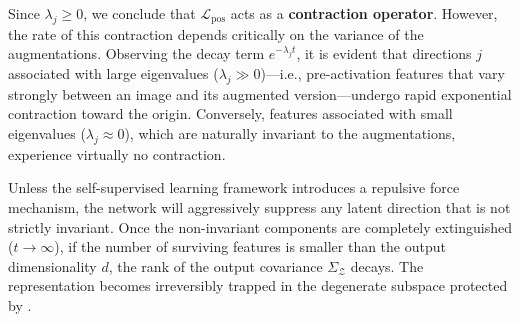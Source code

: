\documentclass[11pt, oneside, openany]{book}
\begin{document}
Since $\lambda_{j} \geq 0$, we conclude that $\mathcal{L}_{\text{pos}}$ acts as a \textbf{contraction operator}. However, the rate of this contraction depends critically on the variance of the augmentations. Observing the decay term $e^{-\lambda_{j} t}$, it is evident that directions $j$ associated with large eigenvalues ($\lambda_{j} \gg 0$)---i.e., pre-activation features that vary strongly between an image and its augmented version---undergo rapid exponential contraction toward the origin. Conversely, features associated with small eigenvalues ($\lambda_{j} \approx 0$), which are naturally invariant to the augmentations, experience virtually no contraction.

Unless the self-supervised learning framework introduces a repulsive force mechanism, the network will aggressively suppress any latent direction that is not strictly invariant. Once the non-invariant components are completely extinguished ($t \to \infty$), if the number of surviving features is smaller than the output dimensionality $d$, the rank of the output covariance $\Sigma_{\mathcal{Z}}$ decays. The representation becomes irreversibly trapped in the degenerate subspace protected by .
\end{document}
